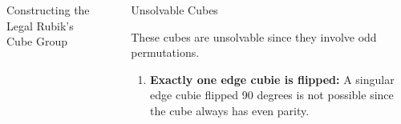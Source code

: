 \documentclass[final]{beamer}
\newlength{\sepwidth}
\newlength{\colwidth}
\newcommand{\separatorcolumn}{\begin{column}{\sepwidth}\end{column}}
\begin{document}
\begin{frame}[t]
\begin{columns}[t]
\begin{column}{\colwidth}
\begin{block}{Constructing the Legal Rubik's Cube Group}




    




  \end{block}

\end{column}

\separatorcolumn

\begin{column}{\colwidth}

  \begin{block}{Unsolvable Cubes}

    These cubes are unsolvable since they involve odd permutations.

    \begin{enumerate}
      
      \item \textbf{Exactly one edge cubie is flipped:}
      A singular edge cubie flipped 90 degrees is not possible since the cube always has even parity.
      

\end{enumerate}
\end{block}
\end{column}
\end{columns}
\end{frame}
\end{document}
